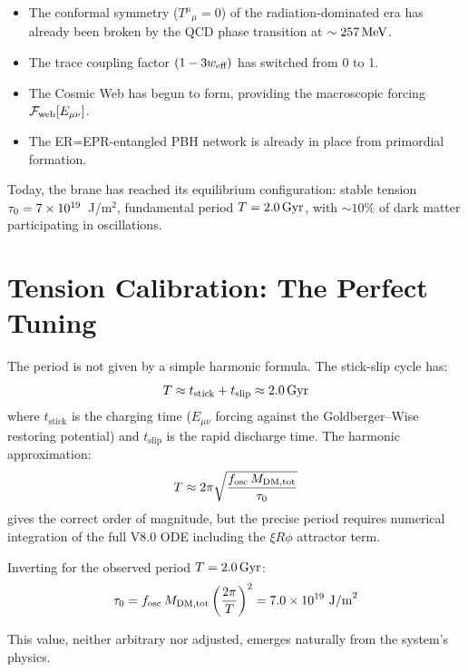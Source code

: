 \begin{itemize}
  \item The conformal symmetry ($T^\mu{}_\mu = 0$) of the radiation-dominated era has already been broken by the QCD phase transition at $\sim 257\,\text{MeV}$.
  \item The trace coupling factor $(1 - 3w_\text{eff})$ has switched from 0 to 1.
  \item The Cosmic Web has begun to form, providing the macroscopic forcing $\mathcal{F}_\text{web}[E_{\mu\nu}]$.
  \item The ER=EPR-entangled PBH network is already in place from primordial formation.
\end{itemize}

Today, the brane has reached its equilibrium configuration: stable tension $\tau_0 = 7 \times 10^{19}$~J/m$^2$, fundamental period $T = 2.0\,\text{Gyr}$, with $\sim 10\%$ of dark matter participating in oscillations.

\section{Tension Calibration: The Perfect Tuning}
\label{sec:calibration}

The period is not given by a simple harmonic formula. The stick-slip cycle has:
\begin{equation}
T \approx t_\text{stick} + t_\text{slip} \approx 2.0\,\text{Gyr}
\end{equation}
where $t_\text{stick}$ is the charging time ($E_{\mu\nu}$ forcing against the Goldberger--Wise restoring potential) and $t_\text{slip}$ is the rapid discharge time. The harmonic approximation:
\begin{equation}
T \approx 2\pi\sqrt{\frac{f_\text{osc}\,M_\text{DM,tot}}{\tau_0}}
\end{equation}
gives the correct order of magnitude, but the precise period requires numerical integration of the full V8.0 ODE including the $\xi R\phi$ attractor term.

Inverting for the observed period $T = 2.0\,\text{Gyr}$:
\begin{equation}
\tau_0 = f_\text{osc}\,M_\text{DM,tot}\left(\frac{2\pi}{T}\right)^2 = 7.0 \times 10^{19}\text{ J/m}^2
\end{equation}

This value, neither arbitrary nor adjusted, emerges naturally from the system's physics.

